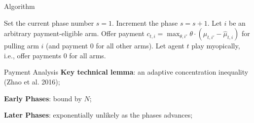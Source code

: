 \documentclass[serif]{beamer}
\begin{document}
\begin{frame}{Algorithm}

\begin{algorithmic}
\STATE Set the current phase number $s = 1$.
 {
\STATE Increment the phase $s = s + 1$.
\ENDIF
{} 
    \STATE Let $i$ be an arbitrary payment-eligible arm.
    \STATE Offer payment $c_{t,i} = \max_{\theta,i'} \theta \cdot (\hat{\mu}_{t,i'} - \hat{\mu}_{t,i})$ for pulling arm $i$ (and payment 0 for all other arms).
\ELSE
    \STATE Let agent $t$ play myopically, i.e., offer payments 0 for all arms.
\ENDIF 
}\ENDFOR
\end{algorithmic}

\end{frame}
\begin{frame}{Payment Analysis}
\textbf{Key technical lemma}: an adaptive concentration inequality (Zhao et al. 2016);
\vspace{1cm}

\textbf{Early Phases}: bound by $N$;
\vspace{1cm}

\textbf{Later Phases}: exponentially unlikely as the phases advances;
\end{frame}
\end{document}
